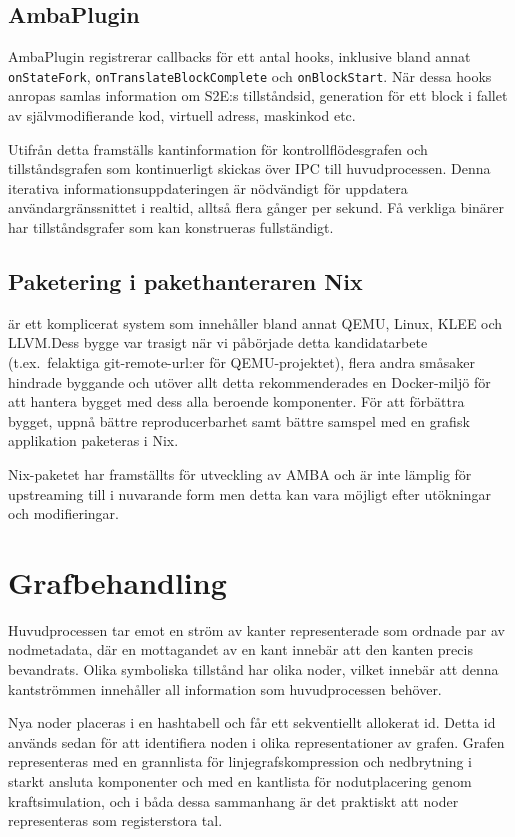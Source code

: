 \subsection{AmbaPlugin}

AmbaPlugin registrerar callbacks för ett antal hooks, inklusive bland annat
\texttt{onStateFork}, \texttt{onTranslateBlockComplete} och
\texttt{onBlockStart}. När dessa hooks anropas samlas information om S2E:s
tillståndsid, generation för ett block i fallet av självmodifierande kod,
virtuell adress, maskinkod etc.

Utifrån detta framställs kantinformation för kontrollflödesgrafen och
tillståndsgrafen som kontinuerligt skickas över IPC till huvudprocessen. Denna
iterativa informationsuppdateringen är nödvändigt för uppdatera
användargränssnittet i realtid, alltså flera gånger per sekund. Få verkliga
binärer har tillståndsgrafer som kan konstrueras fullständigt.

\subsection{Paketering i pakethanteraren Nix}

\stoe{} är ett komplicerat system som innehåller bland annat QEMU, Linux, KLEE
och LLVM.\@ Dess bygge var trasigt när vi påbörjade detta kandidatarbete (t.ex.\
felaktiga git-remote-url:er för QEMU-projektet), flera andra småsaker hindrade
byggande och utöver allt detta rekommenderades en Docker-miljö för att hantera
bygget med dess alla beroende komponenter. För att förbättra bygget, uppnå
bättre reproducerbarhet samt bättre samspel med en grafisk applikation paketeras
\stoe{} i Nix.

Nix-paketet \stoe{} har framställts för utveckling av AMBA och är inte lämplig
för upstreaming till \stoe{} i nuvarande form men detta kan vara möjligt efter
utökningar och modifieringar.

\section{Grafbehandling}

Huvudprocessen tar emot en ström av kanter representerade som ordnade par av
nodmetadata, där en mottagandet av en kant innebär att den kanten precis
bevandrats. Olika symboliska tillstånd har olika noder, vilket innebär att denna
kantströmmen innehåller all information som huvudprocessen behöver.

Nya noder placeras i en hashtabell och får ett sekventiellt allokerat id. Detta
id används sedan för att identifiera noden i olika representationer av grafen.
Grafen representeras med en grannlista för linjegrafskompression och nedbrytning
i starkt ansluta komponenter och med en kantlista för nodutplacering genom
kraftsimulation, och i båda dessa sammanhang är det praktiskt att noder
representeras som registerstora tal.

